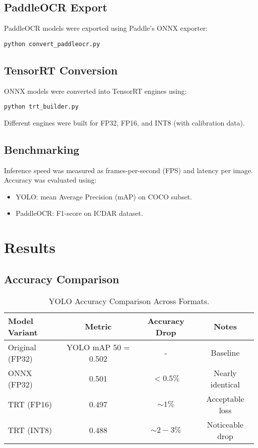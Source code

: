 \documentclass[12pt,a4paper]{article}
\begin{document}
\subsection{PaddleOCR Export}
PaddleOCR models were exported using Paddle’s ONNX exporter:
\begin{verbatim}
python convert_paddleocr.py
\end{verbatim}

\subsection{TensorRT Conversion}
ONNX models were converted into TensorRT engines using:
\begin{verbatim}
python trt_builder.py
\end{verbatim}
Different engines were built for FP32, FP16, and INT8 (with calibration data).

\subsection{Benchmarking}
Inference speed was measured as frames-per-second (FPS) and latency per image.  
Accuracy was evaluated using:
\begin{itemize}
    \item YOLO: mean Average Precision (mAP) on COCO subset.
    \item PaddleOCR: F1-score on ICDAR dataset.
\end{itemize}

\section{Results}
\subsection{Accuracy Comparison}
\begin{table}[H]
\centering
\begin{tabular}{lccc}
\toprule
Model Variant & Metric & Accuracy Drop & Notes \\
\midrule
Original (FP32) & YOLO mAP 50 = 0.502 & - & Baseline \\
ONNX (FP32)     & 0.501 & $<0.5\%$ & Nearly identical \\
TRT (FP16)      & 0.497 & $\sim1\%$ & Acceptable loss \\
TRT (INT8)      & 0.488 & $\sim2-3\%$ & Noticeable drop \\
\bottomrule
\end{tabular}
\caption{YOLO Accuracy Comparison Across Formats.}
\end{table}
\end{document}

